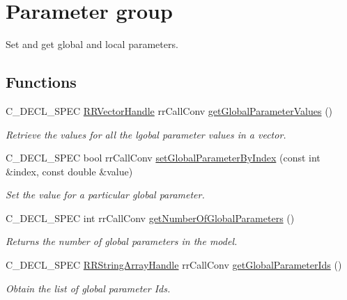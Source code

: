 \hypertarget{group__parameters}{
\section{\-Parameter group}
\label{group__parameters}
}


\-Set and get global and local parameters.  


\subsection*{\-Functions}
\begin{DoxyCompactItemize}
\item 
\-C\-\_\-\-D\-E\-C\-L\-\_\-\-S\-P\-E\-C \hyperlink{rr__c__types_8h_aea46a16752b0ae2cd95c009030ee630e}{\-R\-R\-Vector\-Handle} \*
rr\-Call\-Conv \hyperlink{group__parameters_gaf4be0a5e72db408248569a1d3e28c1f0}{get\-Global\-Parameter\-Values} ()
\begin{DoxyCompactList}\small\item\em \-Retrieve the values for all the lgobal parameter values in a vector. \end{DoxyCompactList}\item 
\-C\-\_\-\-D\-E\-C\-L\-\_\-\-S\-P\-E\-C bool rr\-Call\-Conv \hyperlink{group__parameters_ga65d9546856e5526fc403539903039f8e}{set\-Global\-Parameter\-By\-Index} (const int \&index, const double \&value)
\begin{DoxyCompactList}\small\item\em \-Set the value for a particular global parameter. \end{DoxyCompactList}\item 
\hypertarget{group__parameters_ga2f33a70dfd6c68fb585cf5d1a9c1339c}{
\-C\-\_\-\-D\-E\-C\-L\-\_\-\-S\-P\-E\-C int rr\-Call\-Conv \hyperlink{group__parameters_ga2f33a70dfd6c68fb585cf5d1a9c1339c}{get\-Number\-Of\-Global\-Parameters} ()}
\label{group__parameters_ga2f33a70dfd6c68fb585cf5d1a9c1339c}

\begin{DoxyCompactList}\small\item\em \-Returns the number of global parameters in the model. \end{DoxyCompactList}\item 
\-C\-\_\-\-D\-E\-C\-L\-\_\-\-S\-P\-E\-C \*
\hyperlink{rr__c__types_8h_a90941a6a2247bf7a8ec3d429729c5f9a}{\-R\-R\-String\-Array\-Handle} rr\-Call\-Conv \hyperlink{group__parameters_ga142050a8f4ad5c9a45455102848b5352}{get\-Global\-Parameter\-Ids} ()
\begin{DoxyCompactList}\small\item\em \-Obtain the list of global parameter \-Ids. \end{DoxyCompactList}\end{DoxyCompactItemize}


